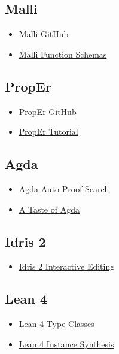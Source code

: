 \documentclass[11pt]{article}
\begin{document}
\subsection{Malli}
\label{sec:org0d6918d}
\begin{itemize}
\item \href{https://github.com/metosin/malli}{Malli GitHub}
\item \href{https://github.com/metosin/malli/blob/master/docs/function-schemas.md}{Malli Function Schemas}
\end{itemize}
\subsection{PropEr}
\label{sec:org219b434}
\begin{itemize}
\item \href{https://github.com/proper-testing/proper}{PropEr GitHub}
\item \href{https://proper-testing.github.io/tutorials/PropEr\_introduction\_to\_Property-Based\_Testing.html}{PropEr Tutorial}
\end{itemize}
\subsection{Agda}
\label{sec:orge075587}
\begin{itemize}
\item \href{https://agda.readthedocs.io/en/latest/tools/auto.html}{Agda Auto Proof Search}
\item \href{https://agda.readthedocs.io/en/latest/getting-started/a-taste-of-agda.html}{A Taste of Agda}
\end{itemize}
\subsection{Idris 2}
\label{sec:org6842a4c}
\begin{itemize}
\item \href{https://idris2.readthedocs.io/en/latest/tutorial/interactive.html}{Idris 2 Interactive Editing}
\end{itemize}
\subsection{Lean 4}
\label{sec:org56182c0}
\begin{itemize}
\item \href{https://lean-lang.org/theorem\_proving\_in\_lean4/type\_classes.html}{Lean 4 Type Classes}
\item \href{https://lean-lang.org/doc/reference/latest/Type-Classes/Instance-Synthesis/}{Lean 4 Instance Synthesis}
\end{itemize}
\end{document}

